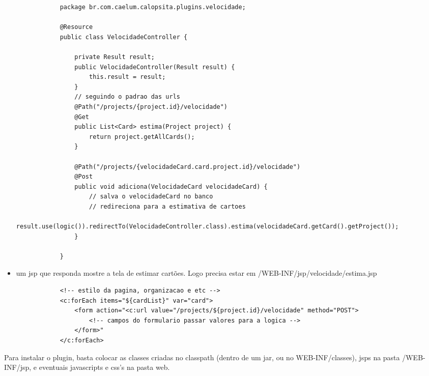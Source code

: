 \begin{itemize}
{		\begin{lstlisting}
			package br.com.caelum.calopsita.plugins.velocidade;
			
			@Resource
			public class VelocidadeController {
				
				private Result result;
				public VelocidadeController(Result result) {
					this.result = result;
				}
				// seguindo o padrao das urls
				@Path("/projects/{project.id}/velocidade")
				@Get
				public List<Card> estima(Project project) {
					return project.getAllCards();
				}
	
				@Path("/projects/{velocidadeCard.card.project.id}/velocidade")
				@Post
				public void adiciona(VelocidadeCard velocidadeCard) {
					// salva o velocidadeCard no banco
					// redireciona para a estimativa de cartoes
					result.use(logic()).redirectTo(VelocidadeController.class).estima(velocidadeCard.getCard().getProject());
				}
				
			}
		\end{lstlisting}
	}
	
	\item{um jsp que responda mostre a tela de estimar cartões. Logo precisa estar em /WEB-INF/jsp/velocidade/estima.jsp
	
		\begin{lstlisting}
			<!-- estilo da pagina, organizacao e etc -->
			<c:forEach items="${cardList}" var="card">
				<form action="<c:url value="/projects/${project.id}/velocidade" method="POST">
					<!-- campos do formulario passar valores para a logica -->
				</form>"
			</c:forEach>
		\end{lstlisting}
	}
\end{itemize}

Para instalar o plugin, basta colocar as classes criadas no classpath (dentro de um jar, ou no WEB-INF/classes),
jsps na pasta /WEB-INF/jsp, e eventuais javascripts e css's na pasta web.


